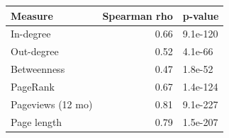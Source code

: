 
\begin{tabular}{lrl}
\toprule
Measure & Spearman rho & p-value\\
\midrule
In-degree & 0.66 & 9.1e-120\\
Out-degree & 0.52 & 4.1e-66\\
Betweenness & 0.47 & 1.8e-52\\
PageRank & 0.67 & 1.4e-124\\
Pageviews (12 mo) & 0.81 & 9.1e-227\\
Page length & 0.79 & 1.5e-207\\
\bottomrule
\end{tabular}
